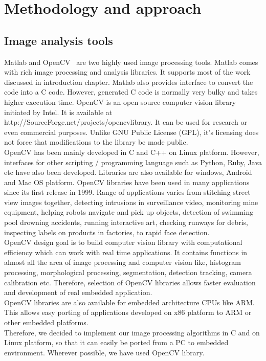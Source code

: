 
\chapter{Methodology and approach} %
\label{Chapter2}

\section{Image analysis tools}
\indent Matlab and OpenCV~\cite{34} are two highly used image
processing tools.  Matlab comes with rich image processing and analysis
libraries. It supports most of the work discussed in introduction
chapter. Matlab also provides interface to convert the code into a C
code. However, generated C code is normally very bulky and takes higher
execution time. OpenCV is an open source computer vision library
initiated by Intel. It is available at
http://SourceForge.net/projects/opencvlibrary. It can be used for
research or even commercial purposes. Unlike GNU Public License (GPL),
it's licensing does not force that modifications to the library be made
public. \\
\indent OpenCV has been mainly developed in C and C++ on Linux platform.
However, interfaces for other scripting / programming language such as
Python, Ruby, Java etc have also been developed. Libraries are also
available for windows, Android and Mac OS platform. OpenCV libraries
have been used in many applications since its first release in 1999.
Range of applications varies from stitching street view images together,
detecting intrusions in surveillance video, monitoring mine equipment,
helping robots navigate and pick up objects, detection of swimming pool
drowning accidents, running interactive art, checking runways for
debris, inspecting labels on products in factories, to rapid face
detection.\\
\indent OpenCV design goal is to build computer vision library with
computational efficiency which can work with real time applications. It
contains functions in almost all the area of image processing  and
computer vision like, histogram processing, morphological processing,
segmentation, detection tracking, camera calibration etc. Therefore,
selection of OpenCV libraries allows faster evaluation and development
of real embedded application.\\
\indent OpenCV libraries are also available for embedded architecture
CPUs like ARM. This allows easy porting of applications developed on x86
platform to ARM or other embedded platforms.\\
\indent Therefore, we decided to implement our image processing
algorithms in C and on Linux platform, so that it can easily be ported
from a PC to embedded environment. Wherever possible, we have used
OpenCV library.
